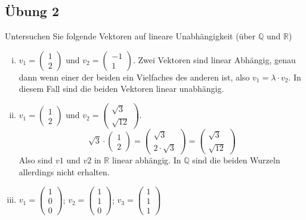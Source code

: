 \documentclass{article}
\begin{document}
\subsection*{Übung 2}

Untersuchen Sie folgende Vektoren auf lineare Unabhängigkeit (über $\mathbb{Q}$ und $\mathbb{R}$)


\begin{enumerate}[(i)]
\item
  $v_1 = \begin{pmatrix}1\\2\end{pmatrix}$ und $v_2 = \begin{pmatrix}-1\\1\end{pmatrix}$.
  Zwei Vektoren sind linear Abhängig, genau dann wenn einer der beiden ein Vielfaches des
  anderen ist, also $v_1 = \lambda \cdot v_2$.
  In diesem Fall sind die beiden Vektoren linear unabhängig.

\item
  $v_1 = \begin{pmatrix}1\\2\end{pmatrix}$ und $v_2 = \begin{pmatrix}\sqrt{3}\\\sqrt{12}\end{pmatrix}$.
  \[
    \sqrt{3} \cdot \begin{pmatrix}1\\2\end{pmatrix} = \begin{pmatrix}\sqrt{3}\\2 \cdot \sqrt{3}\end{pmatrix} = \begin{pmatrix}\sqrt{3}\\\sqrt{12}\end{pmatrix} 
  \]
  Also sind $v1$ und $v2$ in $\mathbb{R}$ linear abhängig. In $\mathbb{Q}$ sind die beiden Wurzeln allerdings nicht erhalten.

\item
  $v_1 = \begin{pmatrix}1\\0\\0\end{pmatrix}$;
  $v_2 = \begin{pmatrix}1\\1\\0\end{pmatrix}$;
  $v_3 = \begin{pmatrix}1\\1\\1\end{pmatrix}$


\end{enumerate}
\end{document}

